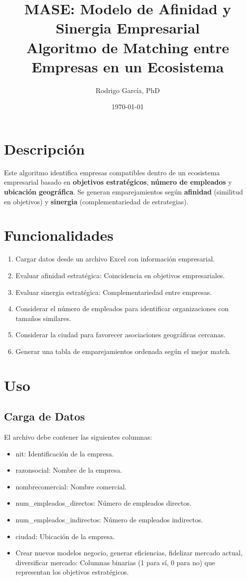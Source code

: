 \documentclass[a4paper,12pt]{article}
\title{MASE: Modelo de Afinidad y Sinergia Empresarial \\[1ex] \large Algoritmo de Matching entre Empresas en un Ecosistema}
\author{Rodrigo García, PhD}
\date{\today}
\begin{document}
\maketitle

\section{Descripción}
Este algoritmo identifica empresas compatibles dentro de un ecosistema empresarial basado en \textbf{objetivos estratégicos}, \textbf{número de empleados} y \textbf{ubicación geográfica}. Se generan emparejamientos según \textbf{afinidad} (similitud en objetivos) y \textbf{sinergia} (complementariedad de estrategias).

\section{Funcionalidades}
\begin{enumerate}
    \item Cargar datos desde un archivo Excel con información empresarial.
    \item Evaluar afinidad estratégica: Coincidencia en objetivos empresariales.
    \item Evaluar sinergia estratégica: Complementariedad entre empresas.
    \item Considerar el número de empleados para identificar organizaciones con tamaños similares.
    \item Considerar la ciudad para favorecer asociaciones geográficas cercanas.
    \item Generar una tabla de emparejamientos ordenada según el mejor match.
\end{enumerate}

\section{Uso}
\subsection{Carga de Datos}
El archivo debe contener las siguientes columnas:
\begin{itemize}
    \item nit: Identificación de la empresa.
    \item razonsocial: Nombre de la empresa.
    \item nombrecomercial: Nombre comercial.
    \item num\_empleados\_directos: Número de empleados directos.
    \item num\_empleados\_indirectos: Número de empleados indirectos.
    \item ciudad: Ubicación de la empresa.
    \item Crear nuevos modelos negocio, generar eficiencias, fidelizar mercado actual, diversificar mercado: Columnas binarias (1 para sí, 0 para no) que representan los objetivos estratégicos.
\end{itemize}
\end{document}
